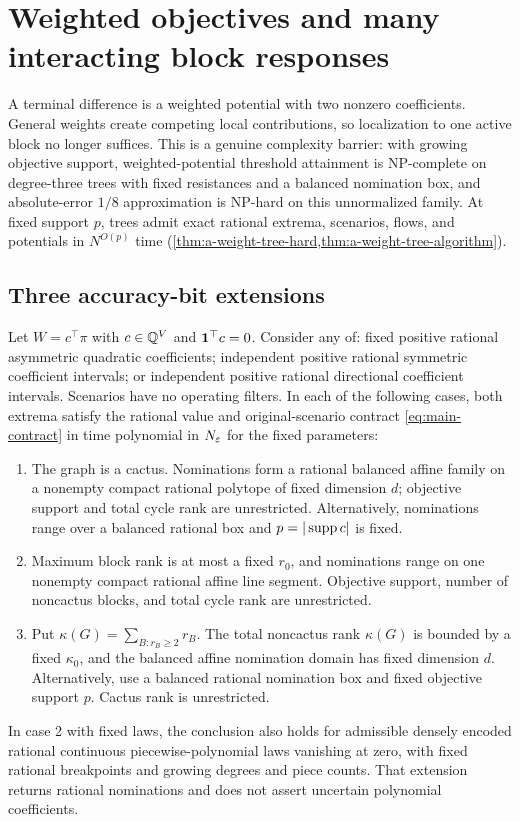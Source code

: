 \section{Weighted objectives and many interacting block responses}
\label{sec:main-weighted}

A terminal difference is a weighted potential with two nonzero
coefficients. General weights create competing local contributions, so
localization to one active block no longer suffices. This is a genuine
complexity barrier: with growing objective support, weighted-potential
threshold attainment is NP-complete on degree-three trees with fixed
resistances and a balanced nomination box, and absolute-error $1/8$
approximation is NP-hard on this unnormalized family. At fixed support
$p$, trees admit exact rational extrema, scenarios, flows, and
potentials in $N^{O(p)}$ time
(\cref{thm:a-weight-tree-hard,thm:a-weight-tree-algorithm}).

\subsection{Three accuracy-bit extensions}

\begin{theorem}
\label{thm:main-weighted}
Let $W=c^\top\pi$ with $c\in\mathbb{Q}^V$ and $\mathbf{1}^\top c=0$. Consider any of:
fixed positive rational asymmetric quadratic coefficients; independent positive rational
symmetric coefficient intervals; or independent positive rational
directional coefficient intervals. Scenarios have no operating filters.
In each of the following cases, both extrema satisfy the rational
value and original-scenario contract \eqref{eq:main-contract} in time
polynomial in $N_\varepsilon$ for the fixed parameters:
\begin{enumerate}
\item The graph is a cactus. Nominations form a rational balanced affine
family on a nonempty compact rational polytope of fixed dimension $d$; objective
support and total cycle rank are unrestricted. Alternatively, nominations
range over a balanced rational box and $p=|\operatorname{supp} c|$ is fixed.
\item Maximum block rank is at most a fixed $r_0$, and nominations
range on one nonempty compact rational affine line segment. Objective
support, number of noncactus blocks, and total cycle rank are unrestricted.
\item Put $\kappa(G)=\sum_{B:r_B\ge2}r_B$. The total noncactus rank
$\kappa(G)$ is bounded by a fixed $\kappa_0$, and the balanced affine
nomination domain has fixed dimension $d$. Alternatively, use a balanced
rational nomination box and fixed objective support $p$. Cactus rank
is unrestricted.
\end{enumerate}
In case 2 with fixed laws, the conclusion also holds for admissible
densely encoded rational continuous piecewise-polynomial laws vanishing
at zero, with fixed rational breakpoints and growing degrees and piece
counts. That extension returns rational nominations and does not assert
uncertain polynomial coefficients.
\end{theorem}

